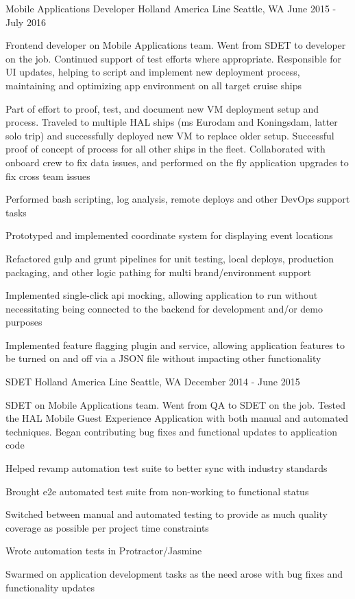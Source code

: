\begin{cventries}
\cventry
{Mobile Applications Developer} %
{Holland America Line} %
{Seattle, WA} %
{June 2015 - July 2016} %
{
\begin{cvitems}
\item {Frontend developer on Mobile Applications team. Went from SDET to developer on the job. Continued support of test efforts where appropriate. Responsible for UI updates, helping to script and implement new deployment process, maintaining and optimizing app environment on all target cruise ships}
\item {Part of effort to proof, test, and document new VM deployment setup and process. Traveled to multiple HAL ships (ms Eurodam and Koningsdam, latter solo trip) and successfully deployed new VM to replace older setup. Successful proof of concept of process for all other ships in the fleet. Collaborated with onboard crew to fix data issues, and performed on the fly application upgrades to fix cross team issues}
\item {Performed bash scripting, log analysis, remote deploys and other DevOps support tasks}
\item {Prototyped and implemented coordinate system for displaying event locations}
\item {Refactored gulp and grunt pipelines for unit testing, local deploys, production packaging, and other logic pathing for multi brand/environment support}
\item {Implemented single-click api mocking, allowing application to run without necessitating being connected to the backend for development and/or demo purposes}
\item {Implemented feature flagging plugin and service, allowing application features to be turned on and off via a JSON file without impacting other functionality}
\end{cvitems}
}

\cventry
{SDET} %
{Holland America Line} %
{Seattle, WA} %
{December 2014 - June 2015} %
{
\begin{cvitems}
\item {SDET on Mobile Applications team. Went from QA to SDET on the job. Tested the HAL Mobile Guest Experience Application with both manual and automated techniques. Began contributing bug fixes and functional updates to application code}
\item {Helped revamp automation test suite to better sync with industry standards}
\item {Brought e2e automated test suite from non-working to functional status}
\item {Switched between manual and automated testing to provide as much quality coverage as possible per project time constraints}
\item {Wrote automation tests in Protractor/Jasmine}
\item {Swarmed on application development tasks as the need arose with bug fixes and functionality updates}
\end{cvitems}
}


\end{cventries}

